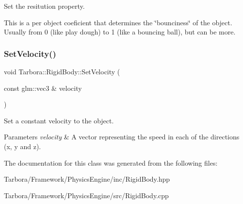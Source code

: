 Set the resitution property. 

This is a per object coeficient that determines the \char`\"{}bounciness\char`\"{} of the object. Usually from 0 (like play dough) to 1 (like a bouncing ball), but can be more. \mbox{\label{classTarbora_1_1RigidBody_adeeb63271e410f12a8ccc3b7d9cb95fb}} 
\subsubsection{\texorpdfstring{Set\+Velocity()}{SetVelocity()}}
{\footnotesize\ttfamily void Tarbora\+::\+Rigid\+Body\+::\+Set\+Velocity (\begin{DoxyParamCaption}\item[{const glm\+::vec3 \&}]{velocity }\end{DoxyParamCaption})}



Set a constant velocity to the object. 


\begin{DoxyParams}{Parameters}
{\em velocity} & A vector representing the speed in each of the directions (x, y and z). \\
\hline
\end{DoxyParams}


The documentation for this class was generated from the following files\+:\begin{DoxyCompactItemize}
\item 
Tarbora/\+Framework/\+Physics\+Engine/inc/Rigid\+Body.\+hpp\item 
Tarbora/\+Framework/\+Physics\+Engine/src/Rigid\+Body.\+cpp\end{DoxyCompactItemize}
